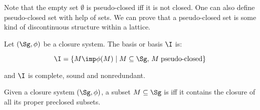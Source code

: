 Note that the empty set $\emptyset$ is pseudo-closed iff it is not closed. One 
can also define pseudo-closed set with help of  sets. We
can prove that a pseudo-closed set is some kind of discontinuous structure 
within a lattice.

\begin{definition} Let $(\Sg, \phi)$ be a 
closure system. The  basis or  basis
$\I$ is:

	\[ \I = \{ M \imp \phi(M) \; | \; M \subseteq \Sg, \, M \;
	 	\text{pseudo-closed} \} \]
	
\noindent and $\I$ is complete, sound and nonredundant.
\end{definition}


\begin{definition} Given a closure system $(\Sg, \phi)$,
a subset $M \subseteq \Sg$ is  iff it contains the closure of
all its proper preclosed subsets.
	
\end{definition}